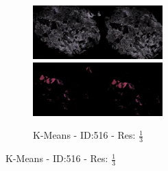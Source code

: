 \documentclass[letterpaper,10pt,oneside]{article}
\begin{document}
\begin{figure}[hbtp]
\begin{subfigure}[b]{5cm}
    \includegraphics[width=5cm]{visualization/results/kmeans/res_reduce_5/Region_0_PO13-00516A1_1_7_201305171148.png}
    \includegraphics[width=5cm]{visualization/results/kmeans/res_reduce_5/Region_1_PO13-00516A1_1_7_201305171148.png}
    \caption{K-Means - ID:516 - Res: $\frac{1}{3}$}
  \end{subfigure}
  

\end{figure}
\end{document}
